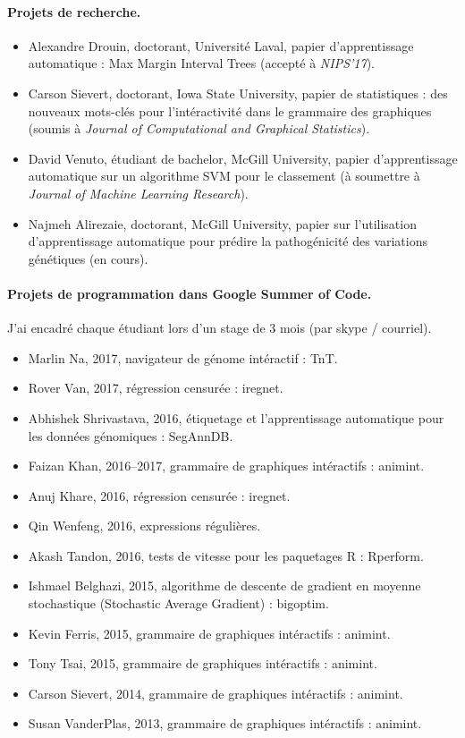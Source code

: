 \documentclass{article}
\begin{document}
\paragraph{Projets de recherche.}
\begin{itemize}
\item Alexandre Drouin, doctorant, Universit\'e Laval, papier
  d'apprentissage automatique : Max Margin Interval Trees (accepté à
  \emph{NIPS'17}).
\item Carson Sievert, doctorant, Iowa State University, papier de
  statistiques : des nouveaux mots-clés pour l'intéractivité dans le
  grammaire des graphiques (soumis à \emph{Journal of Computational
    and Graphical Statistics}).
\item David Venuto, étudiant de bachelor, McGill University, papier
  d'apprentissage automatique sur un algorithme SVM pour le classement
  (à soumettre à \emph{Journal of Machine Learning Research}).
\item Najmeh Alirezaie, doctorant, McGill University, papier sur
  l'utilisation d'apprentissage automatique pour prédire la pathogénicité des
  variations génétiques (en cours).
\end{itemize}

\paragraph{Projets de programmation dans Google Summer of Code.} J'ai
encadré chaque étudiant lors d'un stage de 3 mois (par skype / courriel).
\begin{itemize}
\item Marlin Na, 2017, navigateur de génome intéractif : TnT.
\item Rover Van, 2017, régression censurée : iregnet.
\item Abhishek Shrivastava, 2016, étiquetage et l'apprentissage automatique pour les données génomiques : SegAnnDB.
\item Faizan Khan, 2016--2017, grammaire de graphiques intéractifs : animint.
\item Anuj Khare, 2016, régression censurée : iregnet.
\item Qin Wenfeng, 2016, expressions régulières.
\item Akash Tandon, 2016, tests de vitesse pour les paquetages R : Rperform.
\item Ishmael Belghazi, 2015, algorithme de descente de gradient en moyenne
  stochastique  (Stochastic Average Gradient) : bigoptim.
\item Kevin Ferris, 2015, grammaire de graphiques intéractifs : animint.
\item Tony Tsai, 2015, grammaire de graphiques intéractifs : animint.
\item Carson Sievert, 2014, grammaire de graphiques intéractifs : animint.
\item Susan VanderPlas, 2013, grammaire de graphiques intéractifs : animint.
\end{itemize}
\end{document}

